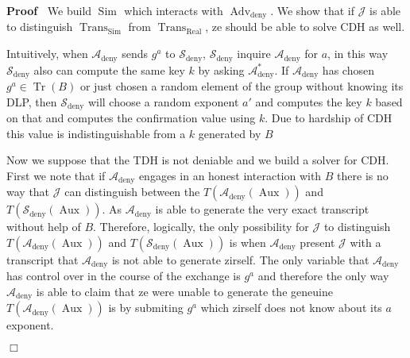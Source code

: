 \documentclass{article}
\newcommand{\tmop}[1]{\ensuremath{\operatorname{#1}}}
\newenvironment{proof}{\noindent\textbf{Proof\ }}{\hspace*{\fill}$\Box$\medskip}
\begin{document}
\begin{proof}
  We build $\tmop{Sim}_{}$ which interacts with $\tmop{Adv}_{\tmop{deny}}$. We
  show that if $\mathcal{J}$ is able to distinguish
  $\tmop{Trans}_{\tmop{Sim}}$ from $\tmop{Trans}_{\tmop{Real}}$, ze should be
  able to solve CDH as well.
  
  Intuitively, when $\mathcal{A}_{\tmop{deny}}$ sends $g^a$ to $\mathcal{}
  \mathcal{S}_{\tmop{deny}}$, $\mathcal{} \mathcal{S}_{\tmop{deny}}$ inquire
  $\mathcal{A}_{\tmop{deny}}$ for $a$, in this way $\mathcal{}
  \mathcal{S}_{\tmop{deny}}$ also can compute the same key $k$ by asking
  $\mathcal{A}_{\tmop{deny}}^{\ast}$. If $\mathcal{A}_{\tmop{deny}}$ has
  chosen $g^a \in \tmop{Tr} (B)$ or just chosen a random element of the group
  without knowing its DLP, then $\mathcal{S}_{\tmop{deny}}$ will choose a
  random exponent $a'$ and computes the key $k$ based on that and computes the
  confirmation value using $k$. Due to hardship of CDH this value is
  indistinguishable from a $k$ generated by $B$
  
  Now we suppose that the TDH is not deniable and we build a solver for CDH.
  First we note that if $\mathcal{A}_{\tmop{deny}}$ engages in an honest
  interaction with $B$ there is no way that $\mathcal{J}$ can distinguish
  between the $T (\mathcal{A}_{\tmop{deny}} (\tmop{Aux}))$ and $T
  (\mathcal{S}_{\tmop{deny}} (\tmop{Aux}))$. As $\mathcal{A}_{\tmop{deny}}$ is
  able to generate the very exact transcript without help of $B$. Therefore,
  logically, the only possibility for $\mathcal{J}$ to distinguish $T
  (\mathcal{A}_{\tmop{deny}} (\tmop{Aux}))$ and $T (\mathcal{S}_{\tmop{deny}}
  (\tmop{Aux}))$ is when $\mathcal{A}_{\tmop{deny}}$ present $\mathcal{J}$
  with a transcript that $\mathcal{A}_{\tmop{deny}}$ is not able to generate
  zirself. The only variable that $\mathcal{A}_{\tmop{deny}}$ has control over
  in the course of the exchange is $g^a$ and therefore the only way
  $\mathcal{A}_{\tmop{deny}}$ is able to claim that ze were unable to generate
  the geneuine \ $T (\mathcal{A}_{\tmop{deny}} (\tmop{Aux}))$ is by submiting
  $g^a$ which zirself does not know about its $a$ exponent.
  

\end{proof}
\end{document}

